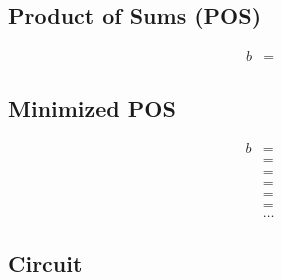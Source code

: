 \documentclass[12pt,a4paper]{report}
\begin{document}
\subsection*{Product of Sums (POS)}

\begin{align*}
	b & = 
\end{align*}

\newpage

\subsection*{Minimized POS}

\begin{align*}
	b & = \\
	    & = \\
	    & = \\
	    & = \\
	    & = \\
	    & = \\
	    & \ldots
\end{align*}

\subsection*{Circuit}
\end{document}
